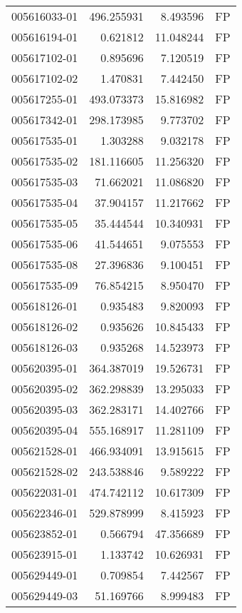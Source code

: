 \begin{tabular}{lrrl}
005616033-01 &  496.255931 &     8.493596 &   FP \\
005616194-01 &    0.621812 &    11.048244 &   FP \\
005617102-01 &    0.895696 &     7.120519 &   FP \\
005617102-02 &    1.470831 &     7.442450 &   FP \\
005617255-01 &  493.073373 &    15.816982 &   FP \\
005617342-01 &  298.173985 &     9.773702 &   FP \\
005617535-01 &    1.303288 &     9.032178 &   FP \\
005617535-02 &  181.116605 &    11.256320 &   FP \\
005617535-03 &   71.662021 &    11.086820 &   FP \\
005617535-04 &   37.904157 &    11.217662 &   FP \\
005617535-05 &   35.444544 &    10.340931 &   FP \\
005617535-06 &   41.544651 &     9.075553 &   FP \\
005617535-08 &   27.396836 &     9.100451 &   FP \\
005617535-09 &   76.854215 &     8.950470 &   FP \\
005618126-01 &    0.935483 &     9.820093 &   FP \\
005618126-02 &    0.935626 &    10.845433 &   FP \\
005618126-03 &    0.935268 &    14.523973 &   FP \\
005620395-01 &  364.387019 &    19.526731 &   FP \\
005620395-02 &  362.298839 &    13.295033 &   FP \\
005620395-03 &  362.283171 &    14.402766 &   FP \\
005620395-04 &  555.168917 &    11.281109 &   FP \\
005621528-01 &  466.934091 &    13.915615 &   FP \\
005621528-02 &  243.538846 &     9.589222 &   FP \\
005622031-01 &  474.742112 &    10.617309 &   FP \\
005622346-01 &  529.878999 &     8.415923 &   FP \\
005623852-01 &    0.566794 &    47.356689 &   FP \\
005623915-01 &    1.133742 &    10.626931 &   FP \\
005629449-01 &    0.709854 &     7.442567 &   FP \\
005629449-03 &   51.169766 &     8.999483 &   FP \\

\end{tabular}
